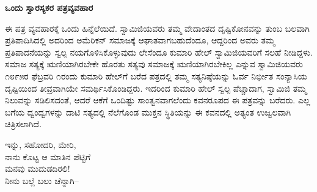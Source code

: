 \begin{myquote}
\end{myquote}

\begin{myquote}
\end{myquote}

\selectkan

\begin{center}
\textbf{ಒಂದು ಸ್ವಾರಸ್ಯಕರ ಪತ್ರವ್ಯವಹಾರ}
\end{center}

ಈ ಪತ್ರ ವ್ಯವಹಾರಕ್ಕೆ ಒಂದು ಹಿನ್ನೆಲೆಯಿದೆ. ಸ್ವಾಮಿಜಿಯವರು ತಮ್ಮ ವೇದಾಂತದ ದೃಷ್ಟಿಕೋನವನ್ನು ತುಂಬ ಬಲವಾಗಿ ಪ್ರತಿಪಾದಿಸಿದಲ್ಲಿ ಅದರಿಂದ ಅಮೆರಿಕನ್ ಸಮಾಜಕ್ಕೆ ಆಘಾತವಾಗಬಹುದೆಂದೂ, ಆದ್ದರಿಂದ ಅವರು ತಮ್ಮ ಪ್ರತಿಪಾದನೆಯನ್ನು ಸ್ವಲ್ಪ ನಯಗೊಳಿಸಿಕೊಳ್ಳುವುದು ಲೇಸೆಂದೂ ಕುಮಾರಿ ಹೇಲ್ ಸ್ವಾಮಿಜಿಯವರಿಗೆ ಸಲಹೆ ನೀಡಿದ್ದಳು. ಸಮಾಜ ಸತ್ಯಕ್ಕೆ ಋಣಿಯಾಗಿರಬೇಕೇ ಹೊರತು ಸತ್ಯವು ಸಮಾಜಕ್ಕೆ ಋಣಿಯಾಗಿರಬೇಕಿಲ್ಲ ಎನ್ನುವ ಸ್ವಾಮಿಜಿಯವರು ೧೮೯೫ರ ಫೆಬ್ರವರಿ ೧ರಂದು ಕುಮಾರಿ ಹೇಲ್‌ಗೆ ಬರೆದ ಪತ್ರದಲ್ಲಿ ತಮ್ಮ ಸತ್ಯನಿಷ್ಠೆಯನ್ನು ಓರ್ವ ನಿರ್ಭೀತ ಸಂನ್ಯಾಸಿಯ ದೃಷ್ಟಿಯಿಂದ ತೀವ್ರವಾಗಿಯೇ ಸಮರ್ಥಿಸಿಕೊಂಡಿದ್ದರು. ಇದರಿಂದ ಕುಮಾರಿ ಹೇಲ್ ಸ್ವಲ್ಪ ಪೆಚ್ಚಾದಾಗ, ಸ್ವಾಮಿಜಿ ತಮ್ಮ ನಿಲುವನ್ನು ಸಡಿಲಿಸದಂತೆ, ಆದರೆ ಆಕೆಗೆ ಒಂದಿಷ್ಟು ಸಾಂತ್ವನವಾಗಲೆಂದು ಕವನರೂಪದ ಈ ಪತ್ರವನ್ನು ಬರೆದರು. ಎಲ್ಲ ಬಗೆಯ ದ್ವಂದ್ವಗಳನ್ನು ದಾಟಿ ಸತ್ಯದಲ್ಲಿ ನೆಲೆಗೊಂಡ ಮುಕ್ತನ ಸ್ಥಿತಿಯನ್ನು ಈ ಕವನದಲ್ಲಿ ಅತ್ಯಂತ ಉಜ್ವಲವಾಗಿ ಚಿತ್ರಿಸಲಾಗಿದೆ.

\begin{myquote}
ಇನ್ನು, ಸಹೋದರಿ, ಮೇರಿ,\\ನಾನು ಕೊಟ್ಟ ಆ ಮಾತಿನ ಪೆಟ್ಟಿಗೆ\\ಮನವು ಮುದುಡದಿರಲಿ!\\ನೀನು ಬಲ್ಲೆ ಬಲು ಚೆನ್ನಾಗಿ–
\end{myquote}

